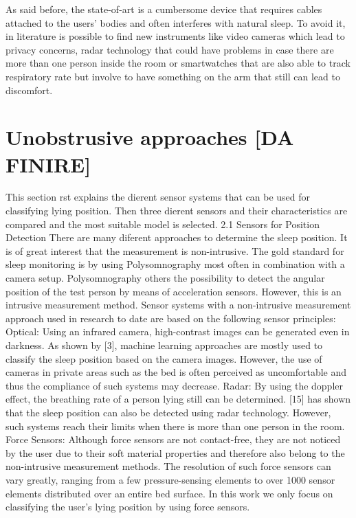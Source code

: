 As said before, the state-of-art is a cumbersome device that requires cables attached to the users' bodies and often interferes with natural sleep. To avoid it, in literature is possible to find new instruments like video cameras which lead to privacy concerns, radar technology that could have problems in case there are more than one person inside the room or smartwatches that are also able to track respiratory rate but involve to have something on the arm that still can lead to discomfort.

\section{Unobstrusive approaches [DA FINIRE]}
This section rst explains the dierent sensor systems that can be used for classifying
lying position. Then three dierent sensors and their characteristics are compared and
the most suitable model is selected.
2.1 Sensors for Position Detection
There are many diferent approaches to determine the sleep position. It is of great interest
that the measurement is non-intrusive. The gold standard for sleep monitoring is by
using Polysomnography most often in combination with a camera setup. Polysomnography
others the possibility to detect the angular position of the test person by means of
acceleration sensors. However, this is an intrusive measurement method. Sensor systems
with a non-intrusive measurement approach used in research to date are based on the
following sensor principles:
Optical: Using an infrared camera, high-contrast images can be generated even in darkness.
As shown by [3], machine learning approaches are mostly used to classify the sleep
position based on the camera images. However, the use of cameras in private areas such
as the bed is often perceived as uncomfortable and thus the compliance of such systems
may decrease.
Radar: By using the doppler effect, the breathing rate of a person lying still can be determined. [15] has shown that the sleep position can also be detected using radar technology.
However, such systems reach their limits when there is more than one person in
the room.
Force Sensors: Although force sensors are not contact-free, they are not noticed by the
user due to their soft material properties and therefore also belong to the non-intrusive
measurement methods. The resolution of such force sensors can vary greatly, ranging from
a few pressure-sensing elements to over 1000 sensor elements distributed over an entire
bed surface.
In this work we only focus on classifying the user's lying position by using force sensors.
